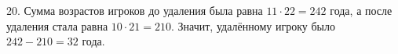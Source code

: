 20. Сумма возрастов игроков до удаления была равна $11\cdot22=242$ года, а после удаления стала равна $10\cdot21=210.$ Значит, удалённому игроку было $242-210=32$ года.\\
